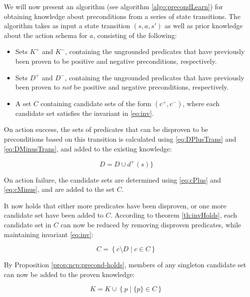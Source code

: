 \documentclass[../../Master.tex]{subfiles}
\begin{document}
We will now present an algorithm (see algorithm \ref{algo:precondLearn}) for obtaining knowledge about preconditions from a series of state transitions. The algorithm takes as input a state transition $(s, a, s')$ as well as prior knowledge about the action schema for $a$, consisting of the following:

\begin{itemize}
    \item Sets $K^+$ and $K^-$, containing the ungrounded predicates that have previously been proven to be positive and negative preconditions, respectively.
    \item Sets $D^+$ and $D^-$, containing the ungrounded predicates that have previously been proven to \textit{not} be positive and negative preconditions, respectively.
    \item A set $C$ containing candidate sets of the form $\left(c^+, c^- \right)$, where each candidate set satisfies the invariant in \eqref{eq:inv}.
\end{itemize}

On action success, the sets of predicates that can be disproven to be preconditions based on this transition is calculated using \eqref{eq:DPlusTrans} and \eqref{eq:DMinusTrans}, and added to the existing knowledge:

\begin{equation*}
    D = D \cup d^+(s)\}
\end{equation*}

On action failure, the candidate sets are determined using \eqref{eq:cPlus} and \eqref{eq:cMinus}, and are added to the set $C$.

It now holds that either more predicates have been disproven, or one more candidate set have been added to $C$. According to theorem \ref{th:invHolds}, each candidate set in $C$ can now be reduced by removing disproven predicates, while maintaining invariant \eqref{eq:inv}:

\begin{equation} \label{reduceCands}
    C = \left\{ c \setminus D \; | \; c \in C \right\}
\end{equation}

By Proposition \ref{prop:ncp:precond-holds}, members of any singleton candidate set can now be added to the proven knowledge:

\begin{equation} \label{eq:extractKnown}
    K = K \cup \left\{ p \; | \; \{ p \} \in C \right\}
\end{equation}
\end{document}
